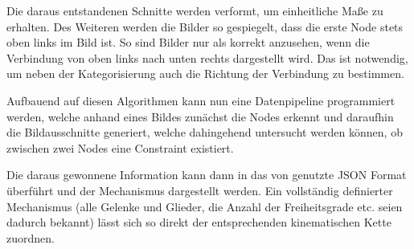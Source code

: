 Die daraus entstandenen Schnitte werden verformt, um einheitliche Ma{\ss}e zu erhalten.
Des Weiteren werden die Bilder so gespiegelt, dass die erste Node stets oben links im Bild ist.
So sind Bilder nur als korrekt anzusehen, wenn die Verbindung von oben links nach unten rechts dargestellt wird.
Das ist notwendig, um neben der Kategorisierung auch die Richtung der Verbindung zu bestimmen.

Aufbauend auf diesen Algorithmen kann nun eine Datenpipeline programmiert werden, welche anhand eines Bildes zunächst die Nodes erkennt und daraufhin die Bildausschnitte generiert, welche dahingehend untersucht werden können, ob zwischen zwei Nodes eine Constraint existiert.

Die daraus gewonnene Information kann dann in das von  genutzte JSON Format überführt und der Mechanismus dargestellt werden.
Ein vollständig definierter Mechanismus (alle Gelenke und Glieder, die Anzahl der Freiheitsgrade etc. seien dadurch bekannt) lässt sich so direkt der entsprechenden kinematischen Kette zuordnen.
